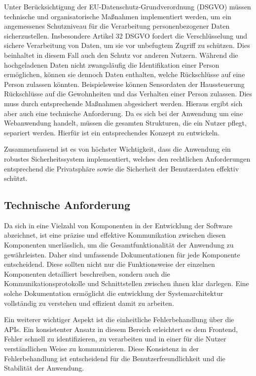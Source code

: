 Unter Berücksichtigung der EU-Datenschutz-Grundverordnung (DSGVO) müssen technische und organisatorische Maßnahmen implementiert werden, um ein angemessenes Schutzniveau für die 
Verarbeitung personenbezogener Daten sicherzustellen. Insbesondere Artikel 32 DSGVO fordert die Verschlüsselung und sichere Verarbeitung von Daten, um sie vor unbefugtem Zugriff zu schützen. Dies beinhaltet in diesem Fall auch den 
Schutz vor anderen Nutzern. Während die hochgeladenen Daten nicht zwangsläufig die Identifikation einer Person ermöglichen, können sie dennoch Daten enthalten, welche Rückschlüsse auf eine Person zulassen könnten. 
Beispielsweise können Sensordaten der Haussteuerung Rückschlüsse auf die Gewohnheiten und das Verhalten einer Person zulassen. Dies muss durch entsprechende Maßnahmen abgesichert werden. Hieraus ergibt sich aber auch eine technische Anforderung. 
Da es sich bei der Anwendung um eine Webanwendung handelt, müssen die gesamten Strukturen, die ein Nutzer pflegt, separiert werden. Hierfür ist ein entsprechendes Konzept zu entwickeln.

Zusammenfassend ist es von höchster Wichtigkeit, dass die Anwendung ein robustes Sicherheitssystem implementiert, welches den rechtlichen Anforderungen entsprechend die Privatsphäre sowie die Sicherheit der Benutzerdaten effektiv schützt.


\subsection{Technische Anforderung}
Da sich in eine Vielzahl von Komponenten in der Entwicklung der Software abzeichnet, ist eine präzise und effektive Kommunikation zwischen diesen Komponenten unerlässlich, 
um die Gesamtfunktionalität der Anwendung zu gewährleisten. Daher sind umfassende Dokumentationen für jede Komponente entscheidend. Diese sollten nicht nur die Funktionsweise der einzelnen Komponenten detailliert beschreiben, sondern 
auch die Kommunikationsprotokolle und Schnittstellen zwischen ihnen klar darlegen. Eine solche Dokumentation ermöglicht die entwicklung der Systemarchitektur vollständig zu verstehen und effizient damit zu arbeiten.

Ein weiterer wichtiger Aspekt ist die einheitliche Fehlerbehandlung über die APIs. Ein konsistenter Ansatz in diesem Bereich erleichtert es dem Frontend, Fehler schnell zu identifizieren, zu verarbeiten und in einer für die Nutzer 
verständlichen Weise zu kommunizieren. Diese Konsistenz in der Fehlerbehandlung ist entscheidend für die Benutzerfreundlichkeit und die Stabilität der Anwendung.

